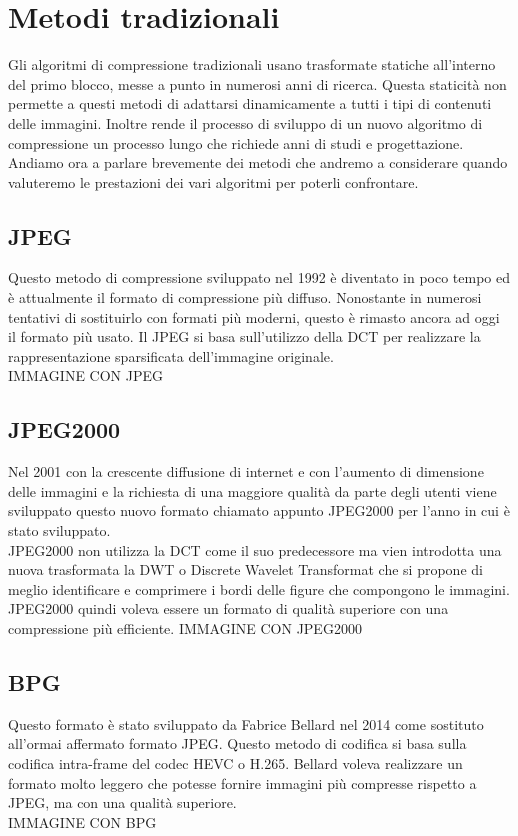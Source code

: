 \chapter{Metodi tradizionali}
Gli algoritmi di compressione tradizionali usano trasformate statiche all’interno del primo blocco, messe a punto in numerosi anni di ricerca. Questa staticità non permette a questi metodi di adattarsi dinamicamente a tutti i tipi di contenuti delle immagini. \cite{cheng2018deep}  Inoltre rende il processo di sviluppo di un nuovo algoritmo di compressione un processo lungo che richiede anni di studi e progettazione. \cite{ cheng2018deep}
Andiamo ora a parlare brevemente dei metodi che andremo a considerare quando valuteremo le prestazioni dei vari algoritmi per poterli confrontare.

\section{JPEG}
Questo metodo di compressione sviluppato nel 1992 è diventato in poco tempo ed è attualmente il formato di compressione più diffuso. Nonostante in numerosi tentativi di sostituirlo con formati più moderni, questo è rimasto ancora ad oggi il formato più usato. Il JPEG si basa sull’utilizzo della DCT per realizzare la rappresentazione sparsificata dell’immagine originale. \cite{ 125072} \\
IMMAGINE CON JPEG

\section{JPEG2000}
Nel 2001 con la crescente diffusione di internet e con l’aumento di dimensione delle immagini e la richiesta di una maggiore qualità da parte degli utenti viene sviluppato questo nuovo formato chiamato appunto JPEG2000 per l’anno in cui è stato sviluppato.\\
JPEG2000 non utilizza la DCT come il suo predecessore ma vien introdotta una nuova trasformata la DWT o Discrete Wavelet Transformat che si propone di meglio identificare e comprimere i bordi delle figure che compongono le immagini. JPEG2000 quindi voleva essere un formato di qualità superiore con una compressione più efficiente. \cite{952804}
IMMAGINE CON JPEG2000

\section{BPG}
Questo formato è stato sviluppato da Fabrice Bellard nel 2014 come sostituto all’ormai affermato formato JPEG. Questo metodo di codifica si basa sulla codifica intra-frame del codec HEVC o H.265. \cite{BPGImageformat} Bellard voleva realizzare un formato molto leggero che potesse fornire immagini più compresse rispetto a JPEG, ma con una qualità superiore.\\
IMMAGINE CON BPG

